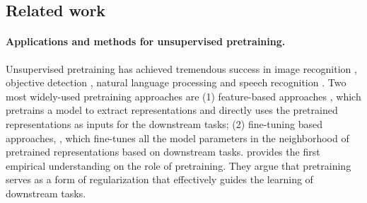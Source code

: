 \subsection{Related work}

\paragraph{Applications and methods for unsupervised pretraining.}
Unsupervised pretraining has achieved tremendous success in image recognition \citep{caron2019unsupervised}, objective detection \citep{dai2021up}, natural language processing \citep{devlin2018bert,radford2018improving,song2019mass} and speech recognition \citep{schneider2019wav2vec,baevski2020wav2vec}. Two most widely-used pretraining approaches are (1) feature-based approaches \citep{brown1992class,mikolov2013distributed,melamud2016context2vec,peters1802deep}, which pretrains a model to extract representations and directly uses the pretrained representations as inputs for the downstream tasks; (2) fine-tuning based approaches, \citep[see, e.g.,][]{devlin2018bert}, which fine-tunes all the model parameters in the neighborhood of pretrained representations based on downstream tasks. \citet{erhan2010does} provides the first empirical understanding on the role of pretraining. They argue that pretraining serves as a form of regularization that effectively guides the learning of downstream tasks.






